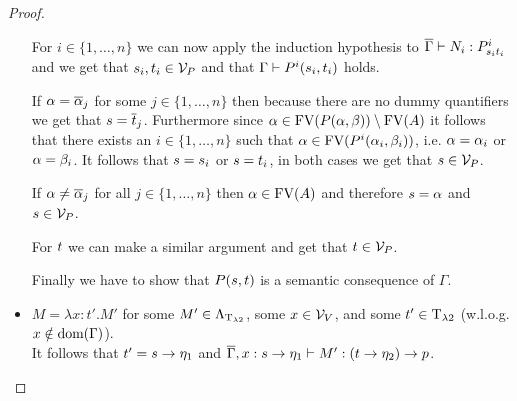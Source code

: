 \begin{proof}
\begin{itemize}
		
		
		\begin{figure}[H]
			\centering
			
		\end{figure}
		
		For $i\in\{1,\dots,n\}$ we can now apply the induction hypothesis to $\trans{\Gamma}\lambdaModels N_i:\code{P^i}{\predTFst[i]}{\predTSnd[i]}$ and we get that $\predTFst[i],\predTSnd[i]\in\VarP$ and that $\Gamma\PModels P^i(\predTFst[i],\predTSnd[i])$ holds.
		
		If $\predFst=\predVec[j]$ for some $j\in\{1,\dots,n\}$ then because there are no dummy quantifiers we get that $\predTFst=\predTVec[j]$. Furthermore since $\alpha\in\FV(P(\predFst,\predSnd))\setminus\FV(A)$ it follows that there exists an $i\in\{1,\dots,n\}$ such that $\predFst\in\FV(P^i(\predFst[i],\predSnd[i]))$, i.e. $\predFst=\predFst[i]$ or $\predFst=\predSnd[i]$. It follows that $\predTFst=\predTFst[i]$ or $\predTFst=\predTSnd[i]$, in both cases we get that $\predTFst\in\VarP$.
		
		If $\predFst\neq\predVec[j]$ for all $j\in\{1,\dots,n\}$ then $\predFst\in\FV(A)$ and therefore $\predTFst=\predFst$ and $\predTFst\in\VarP$.
		
		For $\predTSnd$ we can make a similar argument and get that $\predTSnd\in\VarP$.
		
		Finally we have to show that $P(\predTFst,\predTSnd)$ is a semantic consequence of $\Gamma$.
		
		\begin{figure}[H]
			\centering
			
		\end{figure}
		
	\item[] \underline{$M=\lambda x:t'.M'$} for some $M'\in\Lambda_{\text{T}_{\lambda2}}$, some $x\in\mathcal{V}_V$, and some $t'\in\text{T}_{\lambda2}$ (w.l.o.g. $x\notin\text{dom}(\Gamma)$).\\
		It follows that $t'=\predTFst\to \eta_1$ and $\trans{\Gamma},x:\predTFst\to \eta_1\lambdaModels M':(\predTSnd\to \eta_2)\to p$.
		

\end{itemize}
\end{proof}
